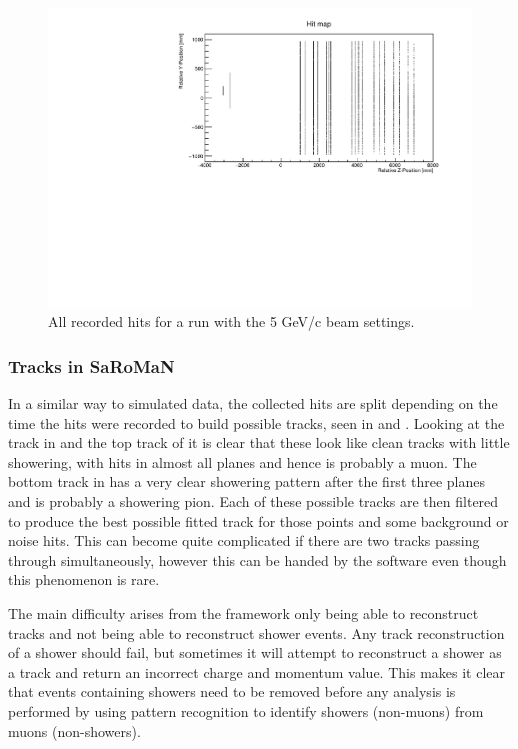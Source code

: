 \begin{figure}[h!]
\centering
\includegraphics[width=\textwidth]{figures/HitMap5GeVYZ.pdf}
\caption{All recorded hits for a run with the 5 GeV/c beam settings.}
\label{fig:hitmap}
\end{figure}


\subsubsection{Tracks in SaRoMaN}
In a similar way to simulated data, the collected hits are split depending on the time the hits were recorded to build possible tracks, seen in  and . Looking at the track in  and the top track of  it is clear that these look like clean tracks with little showering, with hits in almost all planes and hence is probably a muon. The bottom track in  has a very clear showering pattern after the first three planes and is probably a showering pion. Each of these possible tracks are then filtered to produce the best possible fitted track for those points and some background or noise hits. This can become quite complicated if there are two tracks passing through simultaneously, however this can be handed by the software even though this phenomenon is rare.

The main difficulty arises from the framework only being able to reconstruct tracks and not being able to reconstruct shower events. Any track reconstruction of a shower should fail, but sometimes it will attempt to reconstruct a shower as a track and return an incorrect charge and momentum value. This makes it clear that events containing showers need to be removed before any analysis is performed by using pattern recognition to identify showers (non-muons) from muons (non-showers).


